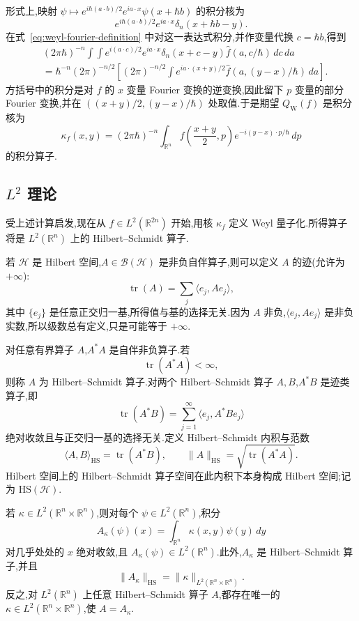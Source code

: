 形式上,映射 $\psi\mapsto e^{i\hbar(a\cdot b)/2}e^{ia\cdot x}\psi(x+\hbar b)$ 的积分核为
\[
e^{i\hbar(a\cdot b)/2}e^{ia\cdot x}\delta_n(x+\hbar b-y).
\]
在式~\eqref{eq:weyl-fourier-definition} 中对这一表达式积分,并作变量代换 $c=\hbar b$,得到
\[
\begin{aligned}
&(2\pi\hbar)^{-n}\int\!\int e^{i(a\cdot c)/2}e^{ia\cdot x}
\delta_n(x+c-y)\widehat f(a,c/\hbar)\,dc\,da\\
&=\hbar^{-n}(2\pi)^{-n/2}
\left[(2\pi)^{-n/2}\int e^{ia\cdot(x+y)/2}
\widehat f(a,(y-x)/\hbar)\,da\right].
\end{aligned}
\]
方括号中的积分是对 $f$ 的 $x$ 变量 Fourier 变换的逆变换,因此留下 $p$ 变量的部分 Fourier 变换,并在 $((x+y)/2,(y-x)/\hbar)$ 处取值.于是期望 $Q_{\mathrm W}(f)$ 是积分核为
\[
\kappa_f(x,y)=(2\pi\hbar)^{-n}\int_{\mathbb R^n}
f\left(\frac{x+y}{2},p\right)e^{-i(y-x)\cdot p/\hbar}\,dp
\label{eq:weyl-kernel-formal}
\]
的积分算子.

\subsection{$L^2$ 理论}
\label{subsec:weyl-l2}

受上述计算启发,现在从 $f\in L^2(\mathbb R^{2n})$ 开始,用核 $\kappa_f$ 定义 Weyl 量子化.所得算子将是 $L^2(\mathbb R^n)$ 上的 Hilbert--Schmidt 算子.

若 $\mathcal H$ 是 Hilbert 空间,$A\in\mathcal B(\mathcal H)$ 是非负自伴算子,则可以定义 $A$ 的迹(允许为 $+\infty$):
\[
\operatorname{tr}(A)=\sum_j\langle e_j,Ae_j\rangle,
\]
其中 $\{e_j\}$ 是任意正交归一基,所得值与基的选择无关.因为 $A$ 非负,$\langle e_j,Ae_j\rangle$ 是非负实数,所以级数总有定义,只是可能等于 $+\infty$.

对任意有界算子 $A$,$A^*A$ 是自伴非负算子.若
\[
\operatorname{tr}(A^*A)<\infty,
\]
则称 $A$ 为 Hilbert--Schmidt 算子.对两个 Hilbert--Schmidt 算子 $A,B$,$A^*B$ 是迹类算子,即
\[
\operatorname{tr}(A^*B)=\sum_{j=1}^{\infty}\langle e_j,A^*Be_j\rangle
\]
绝对收敛且与正交归一基的选择无关.定义 Hilbert--Schmidt 内积与范数
\[
\langle A,B\rangle_{\mathrm{HS}}=\operatorname{tr}(A^*B),
\qquad
\|A\|_{\mathrm{HS}}=\sqrt{\operatorname{tr}(A^*A)}.
\]
Hilbert 空间上的 Hilbert--Schmidt 算子空间在此内积下本身构成 Hilbert 空间;记为 $\mathrm{HS}(\mathcal H)$.

\begin{proposition}\label{prop:kernel-hilbert-schmidt}
若 $\kappa\in L^2(\mathbb R^n\times\mathbb R^n)$,则对每个 $\psi\in L^2(\mathbb R^n)$,积分
\[
A_\kappa(\psi)(x)=\int_{\mathbb R^n}\kappa(x,y)\psi(y)\,dy
\label{eq:integral-operator-kernel}
\]
对几乎处处的 $x$ 绝对收敛,且 $A_\kappa(\psi)\in L^2(\mathbb R^n)$.此外,$A_\kappa$ 是 Hilbert--Schmidt 算子,并且
\[
\|A_\kappa\|_{\mathrm{HS}}=\|\kappa\|_{L^2(\mathbb R^n\times\mathbb R^n)}.
\]
反之,对 $L^2(\mathbb R^n)$ 上任意 Hilbert--Schmidt 算子 $A$,都存在唯一的 $\kappa\in L^2(\mathbb R^n\times\mathbb R^n)$,使 $A=A_\kappa$.
\end{proposition}


